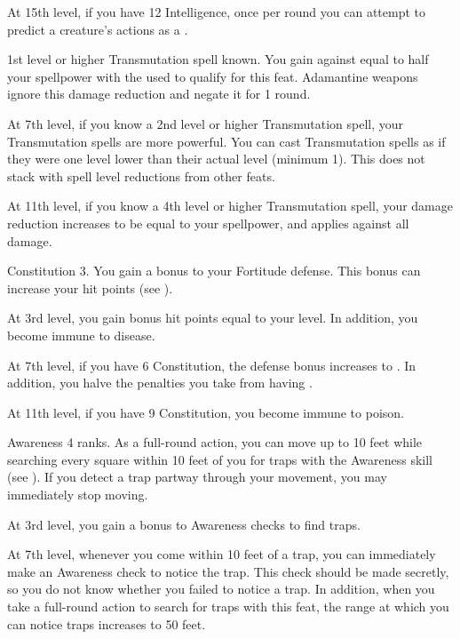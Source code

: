     At 15th level, if you have 12 Intelligence, once per round you can attempt to predict a creature's actions as a .

    \featpre 1st level or higher Transmutation spell known.
    \featben You gain  against  equal to half your spellpower with the  used to qualify for this feat.
    Adamantine weapons ignore this damage reduction and negate it for 1 round.

    At 7th level, if you know a 2nd level or higher Transmutation spell, your Transmutation spells are more powerful.
    You can cast Transmutation spells as if they were one level lower than their actual level (minimum 1).
    This does not stack with spell level reductions from other feats.

    At 11th level, if you know a 4th level or higher Transmutation spell, your damage reduction increases to be equal to your spellpower, and applies against all damage.

    \featpre Constitution 3.
    \featben You gain a  bonus to your Fortitude defense.
    This bonus can increase your hit points (see ).

    At 3rd level, you gain bonus hit points equal to your level.
    In addition, you become immune to disease.

    At 7th level, if you have 6 Constitution, the defense bonus increases to .
    In addition, you halve the penalties you take from having .

    At 11th level, if you have 9 Constitution, you become immune to poison.

    \featpre Awareness 4 ranks.
    \featben As a full-round action, you can move up to 10 feet while searching every square within 10 feet of you for traps with the Awareness skill (see ).
    If you detect a trap partway through your movement, you may immediately stop moving.

    At 3rd level, you gain a  bonus to Awareness checks to find traps.

    At 7th level, whenever you come within 10 feet of a trap, you can immediately make an Awareness check to notice the trap.
    This check should be made secretly, so you do not know whether you failed to notice a trap.
    In addition, when you take a full-round action to search for traps with this feat, the range at which you can notice traps increases to 50 feet.

